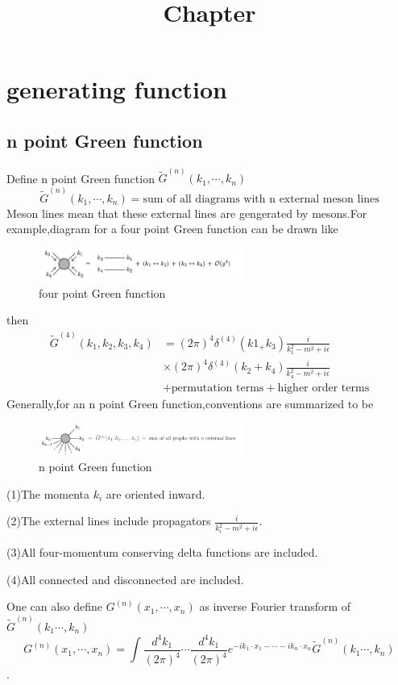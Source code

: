 \documentclass[a4paper]{article}
\begin{document}
	\title{Chapter}
	\date{ }
	\maketitle
\section{generating function}
\subsection{n point Green function}
Define n point Green function $\tilde{G}^{(n)}(k_1,\cdots,k_n)$
$$\tilde{G}^{(n)}(k_1,\cdots,k_n)=\text{sum of all diagrams with n external meson lines}$$Meson lines mean that these external lines are gengerated by mesons.For example,diagram for a four point Green function can be drawn like
\begin{figure}[htbp]
	\centering
	\includegraphics[width=0.6\textwidth]{19.png}
	\caption{four point Green function}
\end{figure}

then
\begin{align*}
	\tilde{G}^{(4)}(k_1,k_2,k_3,k_4)&=(2\pi)^4\delta^{(4)}(k1_+k_3)\frac{i}{k_1^2-m^2+i\epsilon}\\&\times(2\pi)^4\delta^{(4)}(k_2+k_4)\frac{i}{k_4^2-m^2+i\epsilon}\\&+\text{permutation terms}+\text{higher order terms}
\end{align*}
Generally,for an n point Green function,conventions are summarized to be
\begin{figure}[htbp]
	\centering
	\includegraphics[width=0.6\textwidth]{20.png}
	\caption{n point Green function}
\end{figure}

\par (1)The momenta $k_i$ are oriented inward.
\par (2)The external lines include propagators $\frac{i}{k_i^2-m^2+i\epsilon}$.
\par (3)All four-momentum conserving delta functions are included.
\par (4)All connected and disconnected are included.
\vspace{0.02\textheight}
\par One can also define $G^{(n)}(x_1,\cdots,x_n)$ as inverse Fourier transform of $\tilde{G}^{(n)}(k_1\cdots,k_n)$ 
$$G^{(n)}(x_1,\cdots,x_n)=\int\frac{d^4k_1}{(2\pi)^4}\cdots\frac{d^4k_1}{(2\pi)^4}e^{-ik_1\cdot x_1-\cdots-ik_n\cdot x_n}\tilde{G}^{(n)}(k_1\cdots,k_n)$$.
\end{document}
